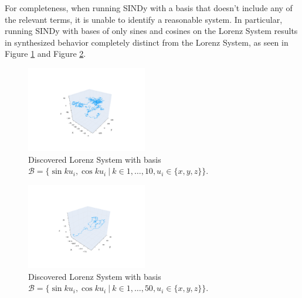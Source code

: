 \documentclass[10pt]{paper}
\begin{document}
For completeness, when running SINDy with a basis that doesn't include any of the relevant terms, it is unable to identify a reasonable system. In particular, running SINDy with bases of only sines and cosines on the Lorenz System results in synthesized behavior completely distinct from the Lorenz System, 
as seen in Figure \ref{fig:found_lorenz_ex_7} and Figure \ref{fig:found_lorenz_ex_8}.
\begin{figure}[H]
	\caption{Discovered Lorenz System with basis $\mathcal B = \{ \sin{ku_i}, \cos{ku_i} \ | \ k \in 1, \ldots, 10, u_i \in \{x,y,z\} \}$.}
	\label{fig:found_lorenz_ex_7}

	\centering 
	\includegraphics[width = 0.47\textwidth, trim={4.3cm, 1.9cm, 4.3cm, 3.5cm}, clip]{lorenz_found_basis_ex_7.pdf}

\end{figure}
\begin{figure}[H]
	\caption{Discovered Lorenz System with basis $\mathcal B = \{ \sin{ku_i}, \cos{ku_i} \ | \ k \in 1, \ldots, 50, u_i \in \{x,y,z\} \}$.}
	\label{fig:found_lorenz_ex_8}

	\centering 
	\includegraphics[width = 0.47\textwidth, trim={4.3cm, 1.9cm, 4.3cm, 3.5cm}, clip]{lorenz_found_basis_ex_8.pdf}

\end{figure}

\newpage
\printbibliography
\end{document}
